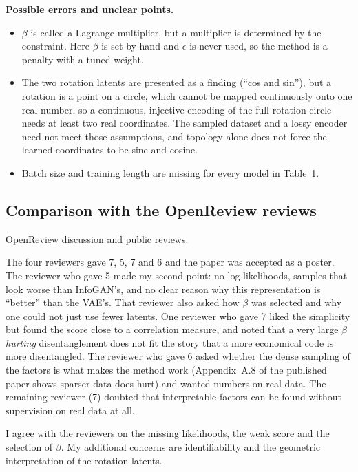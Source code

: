 \textbf{Possible errors and unclear points.}
\begin{itemize}
\item $\beta$ is called a Lagrange multiplier, but a multiplier is determined by the constraint. Here $\beta$ is set by hand and $\epsilon$ is never used, so the method is a penalty with a tuned weight.
\item The two rotation latents are presented as a finding (``cos and sin''), but a rotation is a point on a circle, which cannot be mapped continuously onto one real number, so a continuous, injective encoding of the full rotation circle needs at least two real coordinates. The sampled dataset and a lossy encoder need not meet those assumptions, and topology alone does not force the learned coordinates to be sine and cosine.
\item Batch size and training length are missing for every model in Table~1.
\end{itemize}

\subsection{Comparison with the OpenReview reviews}
\noindent\href{https://openreview.net/forum?id=Sy2fzU9gl}{OpenReview discussion and public reviews}.

The four reviewers gave 7, 5, 7 and 6 and the paper was accepted as a poster. The reviewer who gave 5 made my second point: no log-likelihoods, samples that look worse than InfoGAN's, and no clear reason why this representation is ``better'' than the VAE's. That reviewer also asked how $\beta$ was selected and why one could not just use fewer latents. One reviewer who gave 7 liked the simplicity but found the score close to a correlation measure, and noted that a very large $\beta$ \emph{hurting} disentanglement does not fit the story that a more economical code is more disentangled. The reviewer who gave 6 asked whether the dense sampling of the factors is what makes the method work (Appendix~A.8 of the published paper shows sparser data does hurt) and wanted numbers on real data. The remaining reviewer (7) doubted that interpretable factors can be found without supervision on real data at all.

I agree with the reviewers on the missing likelihoods, the weak score and the selection of $\beta$. My additional concerns are identifiability and the geometric interpretation of the rotation latents.


